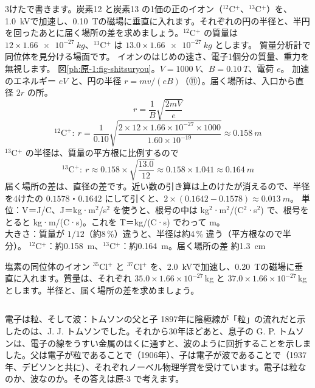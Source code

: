 \label{ph:原-1:ex12}
\begin{phreidai}[質量分析で炭素の同位体を分ける]
3けたで書きます。炭素12 と炭素13 の1価の正のイオン（$^{12}$C$^+$、$^{13}$C$^+$）を、\qty{1.0}{kV}で加速し、\qty{0.10}{T}の磁場に垂直に入れます。それぞれの円の半径と、半円を回ったあとに届く場所の差を求めましょう。$^{12}$C$^+$ の質量は $12\times\qty{1.66e-27}{kg}$、$^{13}$C$^+$ は $13.0\times\qty{1.66e-27}{kg}$ とします。
\phbamen
質量分析計で同位体を見分ける場面です。
\phmushi
イオンのはじめの速さ、電子1個分の質量、重力を無視します。
\phzu
図\ref{ph:原-1:fig-shitsuryou}。$V=\qty{1000}{V}$、$B=\qty{0.10}{T}$、電荷 $e$。
\phriyu
加速のエネルギー $eV$ と、円の半径 $r=mv/(eB)$（⑪）。届く場所は、入口から直径 $2r$ の所。
\phtateru
\[ r=\frac{1}{B}\sqrt{\frac{2mV}{e}} \]
\phtoku
\[ ^{12}\mathrm C^+:\ r=\frac{1}{0.10}\sqrt{\frac{2\times12\times1.66\times10^{-27}\times1000}{1.60\times10^{-19}}}\approx\qty{0.158}{m} \]
$^{13}$C$^+$ の半径は、質量の平方根に比例するので
\[ ^{13}\mathrm C^+:\ r\approx0.158\times\sqrt{\frac{13.0}{12}}\approx0.158\times1.041\approx\qty{0.164}{m} \]
届く場所の差は、直径の差です。近い数の引き算は上のけたが消えるので、半径を4けたの $0.1578$・$0.1642$ にして引くと、$2\times(0.1642-0.1578)\approx\qty{0.013}{m}$。
\phtashikame
単位：V＝J/C、J＝kg·m$^2$/s$^2$ を使うと、根号の中は kg$^2$·m$^2$/(C$^2$·s$^2$) で、根号をとると kg·m/(C·s)。これを T＝kg/(C·s) でわって m。\\
大きさ：質量が $1/12$（約8\,\%）違うと、半径は約4\,\% 違う（平方根なので半分）。
\kotae $^{12}$C$^+$：約\qty{0.158}{m}、$^{13}$C$^+$：約\qty{0.164}{m}。届く場所の差 約\qty{1.3}{cm}
\end{phreidai}
\begin{jibun}
塩素の同位体のイオン $^{35}$Cl$^+$ と $^{37}$Cl$^+$ を、\qty{2.0}{kV}で加速し、\qty{0.20}{T}の磁場に垂直に入れます。質量は、それぞれ $35.0\times1.66\times10^{-27}$\,kg と $37.0\times1.66\times10^{-27}$\,kg とします。半径と、届く場所の差を求めましょう。
\end{jibun}

\begin{column}{電子は粒、そして波：トムソンの父と子}
1897年に陰極線が「粒」の流れだと示したのは、J. J. トムソンでした。それから30年ほどあと、息子の G. P. トムソンは、電子の線をうすい金属のはくに通すと、波のように回折することを示しました。父は電子が粒であることで（1906年）、子は電子が波であることで（1937年、デビソンと共に）、それぞれノーベル物理学賞を受けています。電子は粒なのか、波なのか。その答えは原-3 で考えます。
\end{column}

